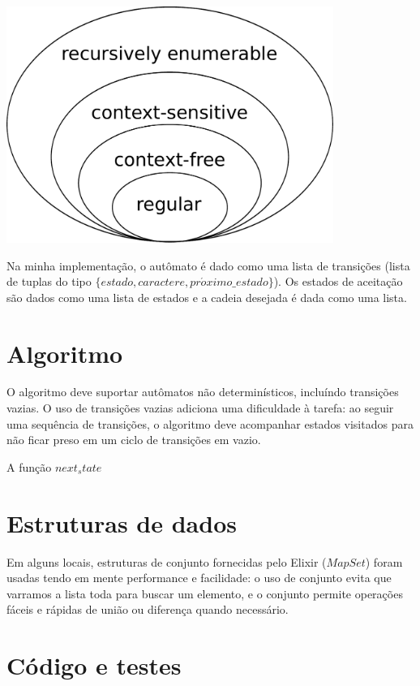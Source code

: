 \documentclass[conference]{IEEEtran}
\begin{document}
\begin{minipage}{\linewidth}
    \centering
    \label{chomsky}
    \includegraphics[width=0.8\textwidth]{Chomsky-hierarchy.pdf}
\end{minipage}

Na minha implementação, o autômato é dado como uma lista de transições (lista de tuplas do tipo $\{estado, caractere, pr\acute{o}ximo\_estado\}$). Os estados de aceitação são dados como uma lista de estados e a cadeia desejada é dada como uma lista.

\section{Algoritmo}

O algoritmo deve suportar autômatos não determinísticos, incluíndo transições vazias. O uso de transições vazias adiciona uma dificuldade à tarefa: ao seguir uma sequência de transições, o algoritmo deve acompanhar estados visitados para não ficar preso em um ciclo de transições em vazio.

A função $next_state$

\section{Estruturas de dados}

Em alguns locais, estruturas de conjunto fornecidas pelo Elixir ($MapSet$) foram usadas tendo em mente performance e facilidade: o uso de conjunto evita que varramos a lista toda para buscar um elemento, e o conjunto permite operações fáceis e rápidas de união ou diferença quando necessário.

\section{Código e testes}
\end{document}
